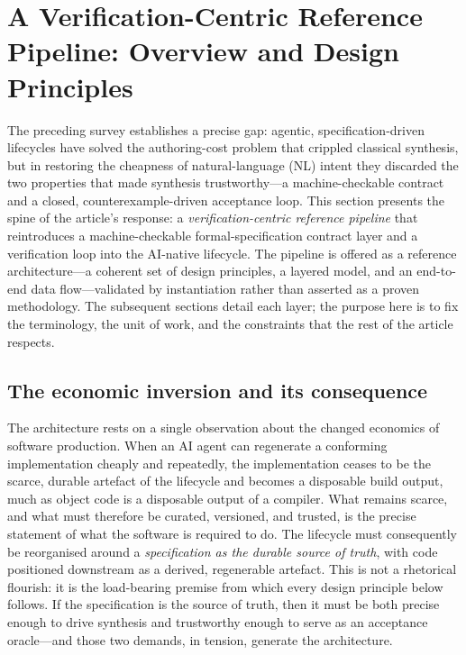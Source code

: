 \section{A Verification-Centric Reference Pipeline: Overview and Design Principles}
\label{sec:architecture}\label{sec:pipeline}

The preceding survey establishes a precise gap: agentic, specification-driven lifecycles have solved the authoring-cost problem that crippled classical synthesis, but in restoring the cheapness of natural-language (NL) intent they discarded the two properties that made synthesis trustworthy---a machine-checkable contract and a closed, counterexample-driven acceptance loop. This section presents the spine of the article's response: a \emph{verification-centric reference pipeline} that reintroduces a machine-checkable formal-specification contract layer and a verification loop into the AI-native lifecycle. The pipeline is offered as a reference architecture---a coherent set of design principles, a layered model, and an end-to-end data flow---validated by instantiation rather than asserted as a proven methodology. The subsequent sections detail each layer; the purpose here is to fix the terminology, the unit of work, and the constraints that the rest of the article respects.

\subsection{The economic inversion and its consequence}
\label{subsec:inversion}

The architecture rests on a single observation about the changed economics of software production. When an AI agent can regenerate a conforming implementation cheaply and repeatedly, the implementation ceases to be the scarce, durable artefact of the lifecycle and becomes a disposable build output, much as object code is a disposable output of a compiler. What remains scarce, and what must therefore be curated, versioned, and trusted, is the precise statement of what the software is required to do. The lifecycle must consequently be reorganised around a \emph{specification as the durable source of truth}, with code positioned downstream as a derived, regenerable artefact. This is not a rhetorical flourish: it is the load-bearing premise from which every design principle below follows. If the specification is the source of truth, then it must be both precise enough to drive synthesis and trustworthy enough to serve as an acceptance oracle---and those two demands, in tension, generate the architecture.

